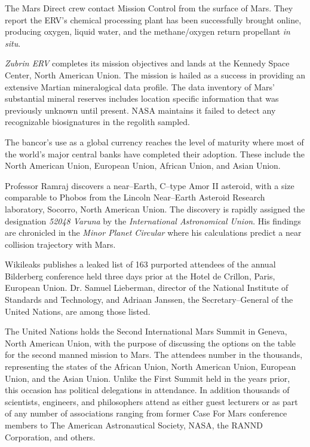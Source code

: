 The Mars Direct crew contact Mission Control from the surface of Mars. They report the ERV's chemical processing plant has been successfully brought online, producing oxygen, liquid water, and the methane/oxygen return propellant {\it in situ}.
\StopTimelineDate

{\it Zubrin ERV} completes its mission objectives and lands at the Kennedy Space Center, North American Union. The mission is hailed as a success in providing an extensive Martian mineralogical data profile. The data inventory of Mars' substantial mineral reserves includes location specific information that was previously unknown until present. NASA maintains it failed to detect any recognizable biosignatures in the regolith sampled.
\StopTimelineDate

The bancor's use as a global currency reaches the level of maturity where most of the world's major central banks have completed their adoption. These include the North American Union, European Union, African Union, and Asian Union.
\StopTimelineDate

Professor Ramraj discovers a near--Earth, C--type Amor II asteroid, with a size comparable to Phobos from the Lincoln Near--Earth Asteroid Research laboratory, Socorro, North American Union. The discovery is rapidly assigned the designation {\it 52048 Varuna} by the {\it International Astronomical Union}. His findings are chronicled in the {\it Minor Planet Circular} where his calculations predict a near collision trajectory with Mars.
\StopTimelineDate

Wikileaks publishes a leaked list of 163 purported attendees of the annual Bilderberg conference held three days prior at the Hotel de Crillon, Paris, European Union. Dr. Samuel Lieberman, director of the National Institute of Standards and Technology, and Adriaan Janssen, the Secretary--General of the United Nations, are among those listed.
\StopTimelineDate

The United Nations holds the Second International Mars Summit in Geneva, North American Union, with the purpose of discussing the options on the table for the second manned mission to Mars. The attendees number in the thousands, representing the states of the African Union, North American Union, European Union, and the Asian Union. Unlike the First Summit held in the years prior, this occasion has political delegations in attendance. In addition thousands of scientists, engineers, and philosophers attend as either guest lecturers or as part of any number of associations ranging from former Case For Mars conference members to The American Astronautical Society, NASA, the RANND Corporation, and others.

